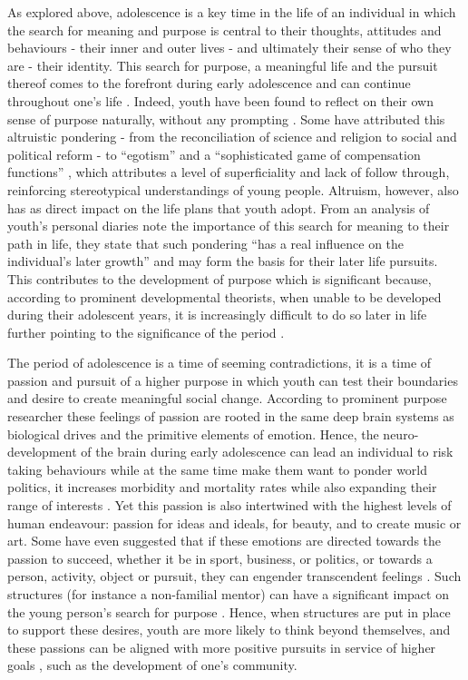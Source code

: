As explored above, adolescence is a key time in the life of an individual in which the search for meaning and purpose is central to their thoughts, attitudes and behaviours - their inner and outer lives - and ultimately their sense of who they are - their identity. This search for purpose, a meaningful life and the pursuit thereof comes to the forefront during early adolescence and can continue throughout one's life \citep{Malin2015}. Indeed, youth have been found to reflect on their own sense of purpose naturally, without any prompting \citep{Inhelder2013}. Some have attributed this altruistic pondering - from the reconciliation of science and religion to social and political reform - to “egotism” and a “sophisticated game of compensation functions” \citep[][p344-345]{Inhelder2013}, which attributes a level of superficiality and lack of follow through, reinforcing stereotypical understandings of young people. Altruism, however, also has as direct impact on the life plans that youth adopt. From an analysis of youth's personal diaries \citet[][pp344]{Inhelder2013} note the importance of this search for meaning to their path in life, they state that such pondering “has a real influence on the individual’s later growth” and may form the basis for their later life pursuits. This contributes to the development of purpose which is significant because, according to prominent developmental theorists, when unable to be developed during their adolescent years, it is increasingly difficult to do so later in life further pointing to the significance of the period \citep[see][]{Marcia1980,Erikson1968,Damon2003}. 

The period of adolescence is a time of seeming contradictions, it is a time of passion and pursuit of a higher purpose in which youth can test their boundaries and desire to create meaningful social change. According to prominent purpose researcher \citet{Damon2009} these feelings of passion are rooted in the same deep brain systems as biological drives and the primitive elements of emotion. Hence, the neuro-development of the brain during early adolescence can lead an individual to risk taking behaviours while at the same time make them want to ponder world politics, it increases morbidity and mortality rates while also expanding their range of interests \citep{Damon2003}. Yet this passion is also intertwined with the highest levels of human endeavour: passion for ideas and ideals, for beauty, and to create music or art. Some have even suggested that if these emotions are directed towards the passion to succeed, whether it be in sport, business, or politics, or towards a person, activity, object or pursuit, they can engender transcendent feelings \citep{Dahl2004}. Such structures (for instance a non-familial mentor) can have a significant impact on the young person's search for purpose \citep{Damon2003}. Hence, when structures are put in place to support these desires, youth are more likely to think beyond themselves, and these passions can be aligned with more positive pursuits in service of higher goals \citep{Dahl2004,Mariano2012}, such as the development of one's community. 

